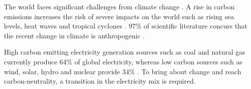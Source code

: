 
The world faces significant challenges from climate change \cite{Masson-Delmotte2018}. A rise in carbon emissions increases the risk of severe impacts on the world such as rising sea levels, heat waves and tropical cyclones \cite{IPCC2014}. 97\% of scientific literature concurs that the recent change in climate is anthropogenic \cite{Cook2013}.

 High carbon emitting electricity generation sources such as coal and natural gas currently produce 64\% of global electricity, whereas low carbon sources such as wind, solar, hydro and nuclear provide 34\% \cite{BP2018,Hall1983}. To bring about change and reach carbon-neutrality, a transition in the electricity mix is required.











